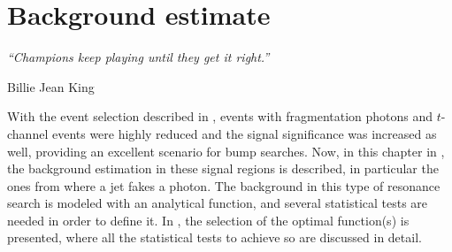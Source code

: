 \chapter{Background estimate}
\label{ch:bkg}
\epigraph{\emph{“Champions keep playing until they get it right.”}}{Billie Jean King}




With the event selection described in \Ch{\ref{ch:evt_selection}}, events with fragmentation photons and \(t\)-channel events were highly reduced and the signal significance was increased as well, providing an excellent scenario for bump searches. Now, in this chapter in \Sect{\ref{sec:bkg:estimation}}, the background estimation in these signal regions is described, in particular the ones from where a jet fakes a photon. The background in this type of resonance search is modeled with an analytical function, and several statistical tests are needed in order to define it. In \Sect{\ref{sec:bkg:modeling}}, the selection of the optimal function(s) is presented, where all the statistical tests to achieve so are discussed in detail.







